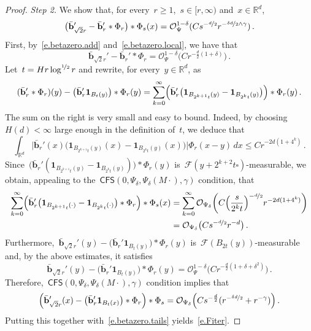 \documentclass[11pt,twoside]{article} %
\let\oldsquare\square %
\renewcommand{\square}{\oldsquare}
\numberwithin{equation}{section}
\theoremstyle{definition}
\newcommand*{\R}{\ensuremath{\mathbb{R}}}
\newcommand{\bhom}{\bar{\mathbf{b}}}
\newcommand{\cu}{\square}
\newcommand{\F}{\mathcal{F}}
\renewcommand{\O}{\mathcal{O}}
\newcommand{\indc}{\boldsymbol{1}}
\newcommand{\CFS}{\mathsf{CFS}}
\begin{document}
\begin{proof}
\smallskip

\emph{Step 2.} We show that, for every~$r\geq 1$,~$s \in [r,\infty)$ and~$x \in \R^d$, 
\begin{equation}  \label{e.Fiter}
\bigl(  \bhom_{\sqrt{2} r}' - \bhom_{r}' \ast \Phi_{r} \bigr) \ast \Phi_{s}(x) 
= 
\O_\Psi^{1-\delta}(C s^{-\nicefrac d2} r^{-\nicefrac{ \delta d}2 \wedge \gamma}) \,.
\end{equation}
First, by~\eqref{e.betazero.add} and~\eqref{e.betazero.local}, we have that 
\begin{equation*}  
\bhom_{\sqrt{2} r}' - \bhom_{r}' \ast \Phi_{r} = \O_{\Psi}^{1-\delta}  \bigl(C r^{-\frac{d}{2}(1+\delta)} \bigr) \,.
\end{equation*}
Let~$t = H r \log^{\nicefrac 12} r$ and rewrite, for every~$y\in \R^d$, as 
\begin{equation*}  
(\bhom_{r}' \ast \Phi_{r})(y)  
- 
\bigl( \bhom_{r}' \indc_{B_{t}(y) } \bigr) \ast \Phi_{r}(y) 
= \sum_{k=0}^\infty \Bigl( \bhom_{r}' \bigl( \indc_{B_{2^{k+1} t}(y)}  - \indc_{B_{2^{k} t}(y)} \bigr)\Bigr)   \ast  \Phi_{r} (y)
\,.
\end{equation*}
The sum on the right is very small and easy to bound. Indeed, by choosing~$H(d)<\infty$ large enough in the definition of~$t$, we deduce that
\begin{equation*}  
\int_{\R^d} \Big| \bhom_{r}'(x) \bigl( \indc_{B_{2^{k+1} t}(y)}(x)  - \indc_{B_{2^{k} t}(y)}(x) \bigr) \Big|  \Phi_{r}(x-y) \, dx
\leq C r^{- 2d (1+4^k)}
 \,.
\end{equation*}
Since~$\bigl( \bhom_{r}' ( \indc_{B_{2^{k+1} t}(y)}  - \indc_{B_{2^{k} t}(y)} ) \bigr) \ast \Phi_{r}(y)$ is~$\F(y+ 2^{k+2} t \cu)$-measurable, we obtain, appealing to the~$\CFS(0,\Psi_\delta,\Psi_\delta(M\cdot),\gamma)$ condition, that 
\begin{align}  \label{e.betazero.tails}
\notag
\sum_{k=0}^\infty \Bigl( \bhom_{r}' \bigl( \indc_{B_{2^{k+1} t}(\cdot)}  - \indc_{B_{2^{k} t}(\cdot)} \bigr)  \ast  \Phi_{r} \Bigr) \ast \Phi_s(x)
& 
=
\sum_{k=0}^\infty  \O_{\Psi_\delta} \biggl( C \Bigr( \frac{s}{2^k t}\Bigr)^{-\nicefrac{d}{2}}  r^{- 2d (1+4^k)} \biggr)
\\ &
= 
 \O_{\Psi_\delta} \bigl( C s^{-\nicefrac{d}{2}} r^{-d} \bigr)
\,.
\end{align}
Furthermore,~$\bhom_{\sqrt{2} r}'(y)  -  \bigl( \bhom_{r}' \indc_{B_{t}(y) } \bigr) \ast \Phi_{r}(y)$ is~$\F(B_{2t}(y))$-measurable and, by the above estimates, it satisfies
\begin{equation*}  
\bhom_{\sqrt{2} r}'(y)  -  \bigl( \bhom_{r}' \indc_{B_{t}(y) } \bigr) \ast \Phi_{r}(y) 
=
\O_{\Psi}^{1-\delta}  \bigl(C r^{-\frac{d}{2}(1+\delta+\delta^2)} \bigr)\,.
\end{equation*}
Therefore,~$\CFS(0,\Psi_\delta,\Psi_\delta(M\cdot),\gamma)$ condition implies that 
\begin{equation*}  
\Bigl( \bhom_{\sqrt{2} r}'(x) -   \bigl( \bhom_{r}' \indc_{B_{t}(x) }  \bigr) \ast \Phi_{r} \Bigr) \ast \Phi_s 
= 
 \O_{\Psi_\delta} \Bigl(C s^{-\frac{d}{2}} ( r^{-\nicefrac{\delta d}{2}}+ r^{-\gamma} ) \Bigr) 
 \,.
\end{equation*}
Putting this together with~\eqref{e.betazero.tails} yields~\eqref{e.Fiter}. 


\end{proof}
\end{document}
